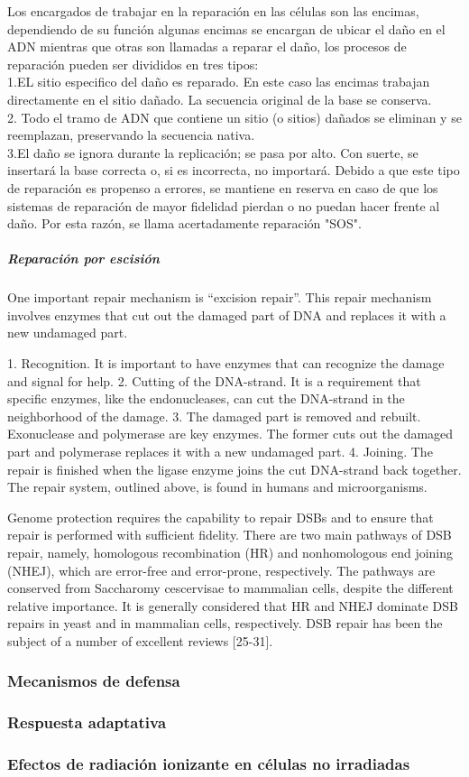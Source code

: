 Los encargados de trabajar en la reparación en las células son las encimas, dependiendo de su función algunas encimas se encargan de ubicar el daño en el ADN mientras que otras son llamadas a reparar el daño, los procesos de reparación pueden ser divididos en tres tipos:\\

1.EL sitio especifico del daño es reparado. En este caso las encimas trabajan directamente en el sitio dañado. La secuencia original de la base se conserva.\\

2. Todo el tramo de ADN que contiene un sitio (o sitios) dañados se eliminan y se reemplazan, preservando la secuencia nativa.\\

3.El daño se ignora durante la replicación; se pasa por alto. Con suerte, se insertará la base correcta o, si es incorrecta, no importará. Debido a que este tipo de reparación es propenso a errores, se mantiene en reserva en caso de que los sistemas de reparación de mayor fidelidad pierdan o no puedan hacer frente al daño. Por esta razón, se llama acertadamente reparación "SOS".\\

\subparagraph{Reparación por escisión}

One important repair mechanism is “excision repair”. This repair mechanism involves enzymes that cut out the damaged part of DNA and replaces it with a new undamaged part.

1. Recognition. It is important to have enzymes that can recognize the damage and signal for help. 2. Cutting of the DNA-strand.
It is a requirement that specific enzymes, like the endonucleases, can cut the DNA-strand in the neighborhood of the damage.
3. The damaged part is removed and rebuilt. Exonuclease and polymerase are key enzymes. The former cuts out the damaged part and polymerase replaces it with a new undamaged part. 4. Joining. The repair is finished when the ligase enzyme joins the cut DNA-strand back together.
The repair system, outlined above, is found in humans and microorganisms.

Genome protection requires the capability to repair DSBs and to ensure that repair is performed with sufficient fidelity. There are two main pathways of DSB repair, namely, homologous recombination (HR) and nonhomologous end joining (NHEJ), which are error-free and error-prone, respectively. The pathways are conserved from Saccharomy cescervisae to mammalian
cells, despite the different relative importance. It is generally considered that HR and NHEJ dominate DSB repairs in yeast and in mammalian cells, respectively. DSB repair has been the subject of a number of excellent reviews [25-31].
\subsubsection{Mecanismos de defensa}

\subsubsection{Respuesta adaptativa}

\subsubsection{Efectos de radiación ionizante en células no irradiadas}
\cite{willmari}
